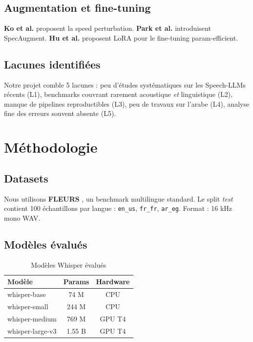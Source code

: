 \documentclass[11pt,a4paper]{article}
\begin{document}
\subsection{Augmentation et fine-tuning}

\textbf{Ko et al.} \cite{ko2015audio} proposent la speed perturbation.
\textbf{Park et al.} \cite{park2019specaugment} introduisent SpecAugment.
\textbf{Hu et al.} \cite{hu2021lora} proposent LoRA pour le fine-tuning
param-efficient.

\subsection{Lacunes identifiées}

Notre projet comble 5 lacunes : peu d'études systématiques sur les
Speech-LLMs récents (L1), benchmarks couvrant rarement acoustique
\textit{et} linguistique (L2), manque de pipelines reproductibles (L3),
peu de travaux sur l'arabe (L4), analyse fine des erreurs souvent absente (L5).

\section{Méthodologie}
\label{sec:method}

\subsection{Datasets}

Nous utilisons \textbf{FLEURS} \cite{conneau2022fleurs}, un benchmark
multilingue standard. Le split \textit{test} contient 100 échantillons par
langue : \texttt{en\_us}, \texttt{fr\_fr}, \texttt{ar\_eg}. Format : 16 kHz
mono WAV.

\subsection{Modèles évalués}

\begin{table}[h]
\centering
\caption{Modèles Whisper évalués}
\label{tab:models}
\begin{tabular}{lcc}
\toprule
\textbf{Modèle} & \textbf{Params} & \textbf{Hardware} \\
\midrule
whisper-base     & 74 M    & CPU \\
whisper-small    & 244 M   & CPU \\
whisper-medium   & 769 M   & GPU T4 \\
whisper-large-v3 & 1.55 B  & GPU T4 \\
\bottomrule
\end{tabular}
\end{table}
\end{document}
